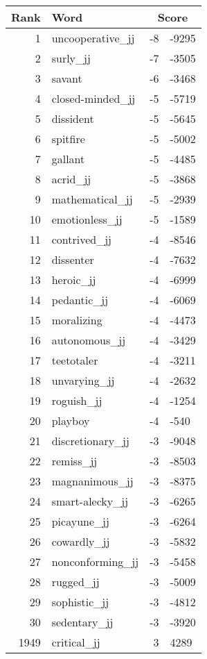 \begin{longtable}[!htbp]{| rlr@{.}l |}
    \hline
    \textbf{Rank} & \textbf{Word} & \multicolumn{2}{c|}{\textbf{Score}} \\
    \hline
    \endhead
    1 & uncooperative\_jj & -8 & -9295 \\
    2 & surly\_jj & -7 & -3505 \\
    3 & savant & -6 & -3468 \\
    4 & closed-minded\_jj & -5 & -5719 \\
    5 & dissident & -5 & -5645 \\
    6 & spitfire & -5 & -5002 \\
    7 & gallant & -5 & -4485 \\
    8 & acrid\_jj & -5 & -3868 \\
    9 & mathematical\_jj & -5 & -2939 \\
    10 & emotionless\_jj & -5 & -1589 \\
    11 & contrived\_jj & -4 & -8546 \\
    12 & dissenter & -4 & -7632 \\
    13 & heroic\_jj & -4 & -6999 \\
    14 & pedantic\_jj & -4 & -6069 \\
    15 & moralizing & -4 & -4473 \\
    16 & autonomous\_jj & -4 & -3429 \\
    17 & teetotaler & -4 & -3211 \\
    18 & unvarying\_jj & -4 & -2632 \\
    19 & roguish\_jj & -4 & -1254 \\
    20 & playboy & -4 & -540 \\
    21 & discretionary\_jj & -3 & -9048 \\
    22 & remiss\_jj & -3 & -8503 \\
    23 & magnanimous\_jj & -3 & -8375 \\
    24 & smart-alecky\_jj & -3 & -6265 \\
    25 & picayune\_jj & -3 & -6264 \\
    26 & cowardly\_jj & -3 & -5832 \\
    27 & nonconforming\_jj & -3 & -5458 \\
    28 & rugged\_jj & -3 & -5009 \\
    29 & sophistic\_jj & -3 & -4812 \\
    30 & sedentary\_jj & -3 & -3920 \\
    1949 & critical\_jj & 3 & 4289 \\

\end{longtable}
